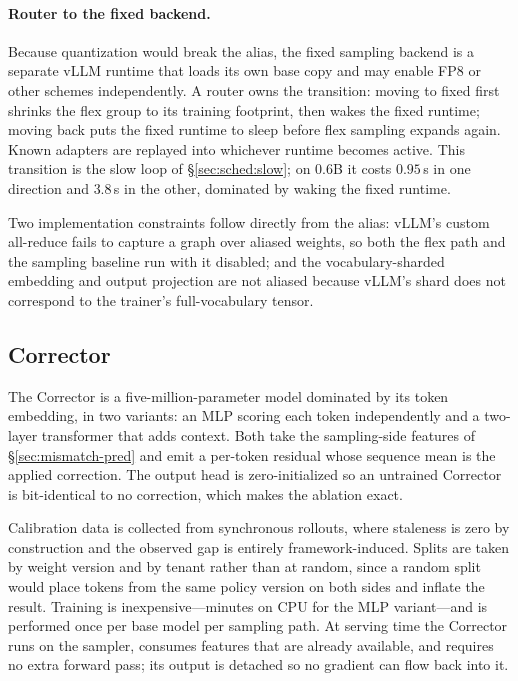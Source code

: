 \paragraph{Router to the fixed backend.} Because quantization would break the alias,
the fixed sampling backend is a separate vLLM runtime that loads its own base copy and
may enable FP8 or other schemes independently. A router owns the transition: moving to
fixed first shrinks the flex group to its training footprint, then wakes the fixed
runtime; moving back puts the fixed runtime to sleep before flex sampling expands
again. Known adapters are replayed into whichever runtime becomes active. This
transition is the slow loop of \S\ref{sec:sched:slow}; on 0.6B it costs $0.95$\,s in
one direction and $3.8$\,s in the other, dominated by waking the fixed runtime.

Two implementation constraints follow directly from the alias: vLLM's custom all-reduce
fails to capture a graph over aliased weights, so both the flex path and the sampling
baseline run with it disabled; and the vocabulary-sharded embedding and output
projection are not aliased because vLLM's shard does not correspond to the trainer's
full-vocabulary tensor.

\subsection{Corrector}
\label{sec:impl:corrector}

The Corrector is a five-million-parameter model dominated by its token embedding, in
two variants: an MLP scoring each token independently and a two-layer transformer that
adds context. Both take the sampling-side features of \S\ref{sec:mismatch-pred} and
emit a per-token residual whose sequence mean is the applied correction. The output
head is zero-initialized so an untrained Corrector is bit-identical to no correction,
which makes the ablation exact.

Calibration data is collected from synchronous rollouts, where staleness is zero by
construction and the observed gap is entirely framework-induced. Splits are taken by
weight version and by tenant rather than at random, since a random split would place
tokens from the same policy version on both sides and inflate the result. Training is
inexpensive---minutes on CPU for the MLP variant---and is performed once per base model
per sampling path. At serving time the Corrector runs on the sampler, consumes features
that are already available, and requires no extra forward pass; its output is detached
so no gradient can flow back into it.

